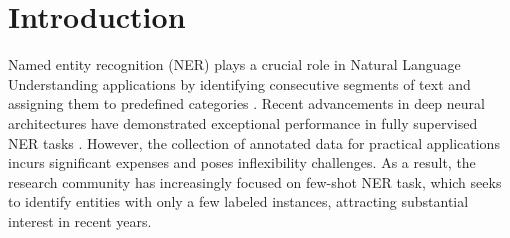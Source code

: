 \documentclass[sigconf,natbib=true,anonymous=False]{acmart}
\begin{document}
\maketitle

\section{Introduction}
Named entity recognition (NER) plays a crucial role in Natural Language Understanding applications by identifying consecutive segments of text and assigning them to predefined categories \cite{molla2006named,nadeau2007survey,guo2009named}. Recent advancements in deep neural architectures have demonstrated exceptional performance in fully supervised NER tasks \cite{lample2016neural,chiu2016named,peters2017semi}. However, the collection of annotated data for practical applications incurs significant expenses and poses inflexibility challenges. As a result, the research community has increasingly focused on few-shot NER task, which seeks to identify entities with only a few labeled instances, attracting substantial interest in recent years.
\end{document}

